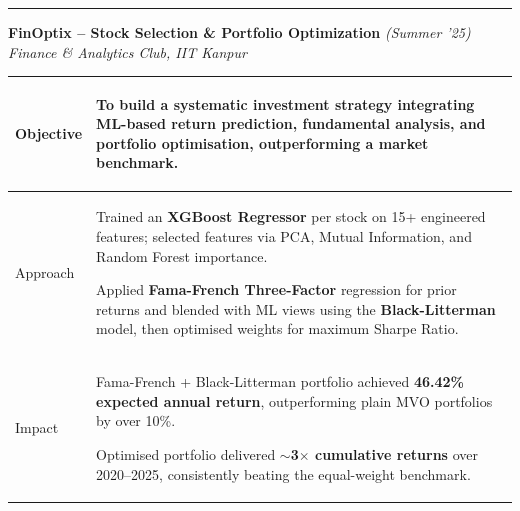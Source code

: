 \documentclass[a4paper,11pt]{article}
\begin{document}
\vspace{2pt}
\hrule
\vspace{6pt}

\noindent
\textbf{FinOptix -- Stock Selection \& Portfolio Optimization} \hfill \textit{(Summer '25)}\\[2pt]
\textit{Finance \& Analytics Club, IIT Kanpur}

\vspace{6pt}

\renewcommand{\arraystretch}{1.3}
\noindent
\begin{tabular}{|>{\centering\arraybackslash}p{1.8cm}|p{13cm}|}
\hline

Objective &
\begin{tabitemize}
    \item To build a systematic investment strategy integrating \textbf{ML-based return prediction}, fundamental analysis, and \textbf{portfolio optimisation}, outperforming a market benchmark.
\end{tabitemize}\\
\hline

Approach &
\begin{tabitemize}
    \item Trained an \textbf{XGBoost Regressor} per stock on 15+ engineered features; selected features via PCA, Mutual Information, and Random Forest importance.
    \item Applied \textbf{Fama-French Three-Factor} regression for prior returns and blended with ML views using the \textbf{Black-Litterman} model, then optimised weights for maximum Sharpe Ratio.
\end{tabitemize}\\
\hline

Impact &
\begin{tabitemize}
    \item Fama-French + Black-Litterman portfolio achieved \textbf{46.42\% expected annual return}, outperforming plain MVO portfolios by over 10\%.
    \item Optimised portfolio delivered \textbf{$\sim$3$\times$ cumulative returns} over 2020--2025, consistently beating the equal-weight benchmark.
\end{tabitemize}\\
\hline

\end{tabular}
\end{document}
